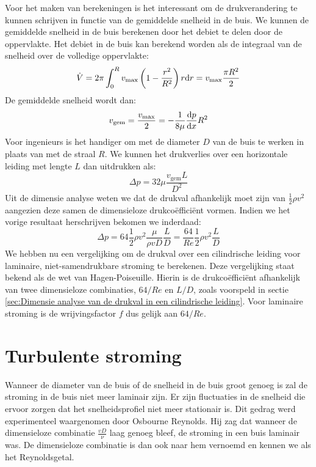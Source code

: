 Voor het maken van berekeningen is het interessant om de drukverandering te kunnen schrijven in functie van de gemiddelde snelheid in de buis. We kunnen de gemiddelde snelheid in de buis berekenen door het debiet te delen door de oppervlakte. Het debiet in de buis kan berekend worden als de integraal van de snelheid over de volledige oppervlakte:
\begin{equation}
	\dot{V} = 2 \pi \int_0^R v_{\text{max}} \left(1- \frac{r^2}{R^2}\right) r \mathrm{d} r = v_{\text{max}} \frac{\pi R^2}{2}
\end{equation}
De gemiddelde snelheid wordt dan:
\begin{equation}
	v_{\text{gem}} = \frac{v_{\text{max}}}{2} = - \frac{1}{8 \mu}\frac{\mathrm{d} p}{\mathrm{d} x} R^2
\end{equation}
Voor ingenieurs is het handiger om met de diameter $D$ van de buis te werken in plaats van met de straal $R$. We kunnen het drukverlies over een horizontale leiding met lengte $L$ dan uitdrukken als:
\begin{equation}
	\Delta p = 32 \mu \frac{v_{\text{gem}} L}{ D^2}
\end{equation}
Uit de dimensie analyse weten we dat de drukval afhankelijk moet zijn van $\frac{1}{2}\rho v^2$ aangezien deze samen de dimensieloze drukcoëfficiënt vormen. Indien we het vorige resultaat herschrijven bekomen we inderdaad:
\begin{equation}
	\Delta p = 64 \frac{1}{2}\rho v^2 \frac{\mu}{\rho v D} \frac{L}{D} = \frac{64}{Re} \frac{1}{2}\rho v^2 \frac{L}{D}
	\label{eqn:drukval bij laminaire stroming}
\end{equation}
We hebben nu een vergelijking om de drukval over een cilindrische leiding voor laminaire, niet-samendrukbare stroming te berekenen. Deze vergelijking staat bekend als de wet van Hagen-Poiseuille. Hierin is de drukcoëfficiënt afhankelijk van twee dimensieloze combinaties, $64/Re$ en $L/D$, zoals voorspeld in sectie \ref{sec:Dimensie analyse van de drukval in een cilindrische leiding}. Voor laminaire stroming is de wrijvingsfactor $f$ dus gelijk aan $64/Re$.

	\section{Turbulente stroming}
	\label{sec:Turbulente stroming}

Wanneer de diameter van de buis of de snelheid in de buis groot genoeg is zal de stroming in de buis niet meer laminair zijn. Er zijn fluctuaties in de snelheid die ervoor zorgen dat het snelheidsprofiel niet meer stationair is. Dit gedrag werd experimenteel waargenomen door Osbourne Reynolds. Hij zag dat wanneer de dimensieloze combinatie $\frac{v D}{\nu}$ laag genoeg bleef, de stroming in een buis laminair was. De dimensieloze combinatie is dan ook naar hem vernoemd en kennen we als het Reynoldsgetal.

